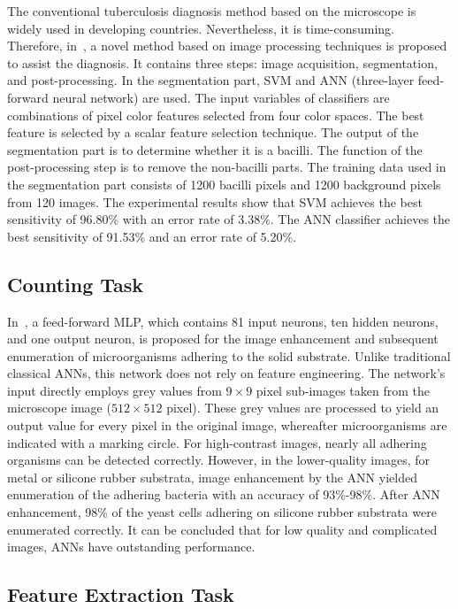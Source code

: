 The conventional tuberculosis diagnosis method based on the microscope is widely used in developing countries. Nevertheless, it is time-consuming. Therefore, in~\cite{Costa-2015-AITM}, a novel method based on image processing techniques is proposed to assist the diagnosis. It contains three steps: image acquisition, segmentation, and post-processing. In the segmentation part, SVM and ANN (three-layer feed-forward neural network) are used. The input variables of classifiers are combinations of pixel color features selected from four color spaces. The best feature is selected by a scalar feature selection technique. The output of the segmentation part is to determine whether it is a bacilli. The function of the post-processing step is to remove the non-bacilli parts. The training data used in the segmentation part consists of 1200 bacilli pixels and 1200 background pixels from 120 images. The experimental results show that SVM achieves the best sensitivity of 96.80\% with an error rate of 3.38\%. The ANN classifier achieves the best sensitivity of 91.53\% and an error rate of 5.20\%.

\subsection{Counting Task}
In~\cite{Wit-1998-AAAN}, a feed-forward MLP, which contains 81 input neurons, ten hidden neurons, and one output neuron, is proposed for the image enhancement and subsequent enumeration of microorganisms adhering to the solid substrate. Unlike traditional classical ANNs, this network does not rely on feature engineering. The network's input directly employs grey values from $9\times9$ pixel sub-images taken from the microscope image ($512\times512$ pixel). These grey values are processed to yield an output value for every pixel in the original image, whereafter microorganisms are indicated with a marking circle. For high-contrast images, nearly all adhering organisms can be detected correctly. However, in the lower-quality images, for metal or silicone rubber substrata, image enhancement by the ANN yielded enumeration of the adhering bacteria with an accuracy of 93\%-98\%. After ANN enhancement, 98\% of the yeast cells adhering on silicone rubber substrata were enumerated correctly. It can be concluded that for low quality and complicated images, ANNs have outstanding performance.


\subsection{Feature Extraction Task}

